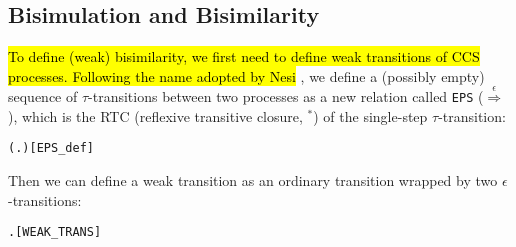 
\subsection{Bisimulation and Bisimilarity}

\hl{To define (weak) bisimilarity, we first need to define weak
transitions of CCS processes. Following the name adopted by Nesi} \cite{Nesi:1992ve},
we define a (possibly empty) sequence of $\tau$-transitions between
two processes as
a new relation called \texttt{EPS} ($\overset{\epsilon}{\Rightarrow}$), which is the RTC
(reflexive transitive closure, $^*$) of the single-step $\tau$-transition:
\begin{alltt}
 \HOLSymConst{=} (\HOLTokenLambda{} .  \HOLTokenTransBegin\HOLSymConst{\ensuremath{\tau}}\HOLTokenTransEnd {})\HOLSymConst{\HOLTokenSupStar{}}\hfill{[EPS_def]}
\end{alltt}
Then we can define a weak transition as an ordinary transition wrapped by
two $\epsilon$-transitions:
\begin{alltt}
 \HOLTokenWeakTransBegin{}\HOLTokenWeakTransEnd {} \HOLSymConst{\HOLTokenEquiv{}} \HOLSymConst{\HOLTokenExists{}} .  \HOLSymConst{\HOLTokenEPS}  \HOLSymConst{\HOLTokenConj{}}  \HOLTokenTransBegin{}\HOLTokenTransEnd {} \HOLSymConst{\HOLTokenConj{}}  \HOLSymConst{\HOLTokenEPS} \hfill{[WEAK_TRANS]}
\end{alltt}

